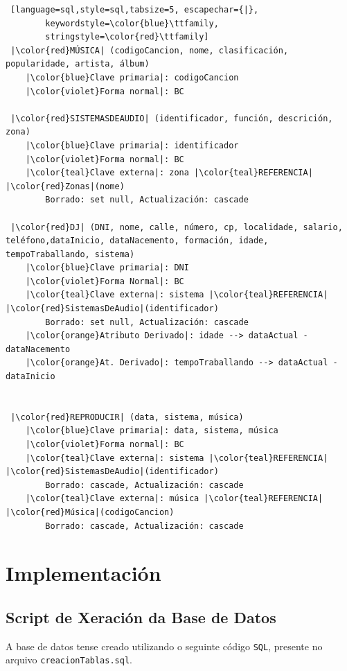 \documentclass[12pt,a4paper]{book}
\theoremstyle{definition}
\theoremstyle{break}
\begin{document}
\begin{lstlisting} [language=sql,style=sql,tabsize=5, escapechar={|},
		keywordstyle=\color{blue}\ttfamily,
		stringstyle=\color{red}\ttfamily]
 |\color{red}MÚSICA| (codigoCancion, nome, clasificación, popularidade, artista, álbum)
	|\color{blue}Clave primaria|: codigoCancion
	|\color{violet}Forma normal|: BC
		
 |\color{red}SISTEMASDEAUDIO| (identificador, función, descrición, zona)
	|\color{blue}Clave primaria|: identificador
	|\color{violet}Forma normal|: BC
	|\color{teal}Clave externa|: zona |\color{teal}REFERENCIA| |\color{red}Zonas|(nome)
		Borrado: set null, Actualización: cascade
		
 |\color{red}DJ| (DNI, nome, calle, número, cp, localidade, salario, teléfono,dataInicio, dataNacemento, formación, idade, tempoTraballando, sistema)
	|\color{blue}Clave primaria|: DNI
	|\color{violet}Forma Normal|: BC
	|\color{teal}Clave externa|: sistema |\color{teal}REFERENCIA| |\color{red}SistemasDeAudio|(identificador)
		Borrado: set null, Actualización: cascade
	|\color{orange}Atributo Derivado|: idade --> dataActual - dataNacemento
	|\color{orange}At. Derivado|: tempoTraballando --> dataActual - dataInicio
		
		
 |\color{red}REPRODUCIR| (data, sistema, música)
	|\color{blue}Clave primaria|: data, sistema, música
	|\color{violet}Forma normal|: BC
	|\color{teal}Clave externa|: sistema |\color{teal}REFERENCIA| |\color{red}SistemasDeAudio|(identificador)
		Borrado: cascade, Actualización: cascade
	|\color{teal}Clave externa|: música |\color{teal}REFERENCIA| |\color{red}Música|(codigoCancion)
		Borrado: cascade, Actualización: cascade
	\end{lstlisting}
	
	
	\chapter{Implementación}
	\section{Script de Xeración da Base de Datos}
	
	A base de datos tense creado utilizando o seguinte código \texttt{SQL}, presente no arquivo \texttt{creacionTablas.sql}.
	
\end{document}
